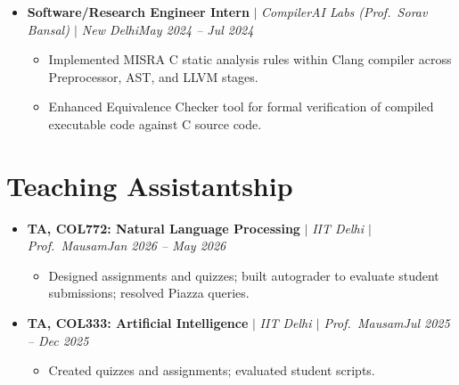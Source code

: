 \documentclass[10pt,letterpaper]{article}
\newcommand{\dates}[1]{\hfill{\color{dateblue}\itshape #1}}
\newcommand{\entry}[3]{\textbf{#1} $|$ \textit{#2}\dates{#3}}
\begin{document}
\begin{itemize}
\begin{itemize}
    \item Automated alpha-generation pipeline using LLMs with custom evaluation loops for iterative refinement.
  \end{itemize}
  \item \entry{Software/Research Engineer Intern}{CompilerAI Labs (Prof.\ Sorav Bansal) $|$ New Delhi}{May 2024 -- Jul 2024}
  \begin{itemize}
    \item Implemented MISRA C static analysis rules within Clang compiler across Preprocessor, AST, and LLVM stages.
    \item Enhanced Equivalence Checker tool for formal verification of compiled executable code against C source code.
  \end{itemize}
\end{itemize}

\section{Teaching Assistantship}
\begin{itemize}
  \item \entry{TA, COL772: Natural Language Processing}{IIT Delhi $|$ Prof.\ Mausam}{Jan 2026 -- May 2026}
  \begin{itemize}
    \item Designed assignments and quizzes; built autograder to evaluate student submissions; resolved Piazza queries.
  \end{itemize}
  \item \entry{TA, COL333: Artificial Intelligence}{IIT Delhi $|$ Prof.\ Mausam}{Jul 2025 -- Dec 2025}
  \begin{itemize}
    \item Created quizzes and assignments; evaluated student scripts.
  \end{itemize}
\end{itemize}
\end{document}
